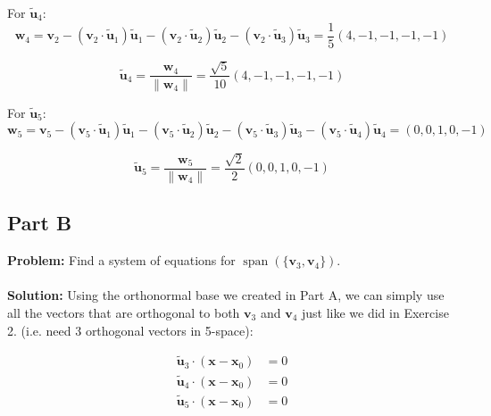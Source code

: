 \documentclass{article}
\begin{document}
For $\tilde{\mathbf u}_4$:
$$\mathbf w_4=\mathbf v_2-(\mathbf v_2\cdot\tilde{\mathbf u}_1)\tilde{\mathbf u}_1-(\mathbf v_2\cdot\tilde{\mathbf u}_2)\tilde{\mathbf u}_2-(\mathbf v_2\cdot\tilde{\mathbf u}_3)\tilde{\mathbf u}_3=\frac{1}{5}(4,-1,-1,-1,-1)$$

$$\tilde{\mathbf u}_4=\frac{\mathbf w_4}{\|\mathbf w_4\|}=\frac{\sqrt{5}}{10}(4,-1,-1,-1,-1)$$

For $\tilde{\mathbf u}_5$:
$$\mathbf w_5=\mathbf v_5-(\mathbf v_5\cdot\tilde{\mathbf u}_1)\tilde{\mathbf u}_1-(\mathbf v_5\cdot\tilde{\mathbf u}_2)\tilde{\mathbf u}_2-(\mathbf v_5\cdot\tilde{\mathbf u}_3)\tilde{\mathbf u}_3-(\mathbf v_5\cdot\tilde{\mathbf u}_4)\tilde{\mathbf u}_4=(0,0,1,0,-1)$$

$$\tilde{\mathbf u}_5=\frac{\mathbf w_5}{\|\mathbf w_4\|}=\frac{\sqrt{2}}{2}(0,0,1,0,-1)$$

\subsection*{Part B}
\textbf{Problem:} Find a system of equations for $\operatorname{span}(\{\mathbf v_3,\mathbf v_4\})$.
\\\\
\textbf{Solution:} Using the orthonormal base we created in Part A, we can simply use all the vectors that are orthogonal to both $\mathbf v_3$ and $\mathbf v_4$ just like we did in Exercise 2. (i.e. need 3 orthogonal vectors in 5-space):

\begin{align*}
  \tilde{\mathbf u}_3\cdot(\mathbf x-\mathbf x_0) &= 0\\
  \tilde{\mathbf u}_4\cdot(\mathbf x-\mathbf x_0) &= 0\\
  \tilde{\mathbf u}_5\cdot(\mathbf x-\mathbf x_0) &= 0
\end{align*}
\end{document}
